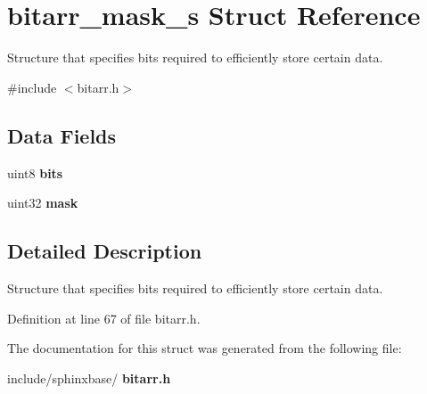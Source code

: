 \section{bitarr\+\_\+mask\+\_\+s Struct Reference}
\label{structbitarr__mask__s}


Structure that specifies bits required to efficiently store certain data.  




{\ttfamily \#include $<$bitarr.\+h$>$}

\subsection*{Data Fields}
\begin{DoxyCompactItemize}
\item 
\mbox{\label{structbitarr__mask__s_a47b05f707efd5233f021bb1276c79b7a}} 
uint8 {\bfseries bits}
\item 
\mbox{\label{structbitarr__mask__s_a034b318c56cbc15befef989a2521623c}} 
uint32 {\bfseries mask}
\end{DoxyCompactItemize}


\subsection{Detailed Description}
Structure that specifies bits required to efficiently store certain data. 

Definition at line 67 of file bitarr.\+h.



The documentation for this struct was generated from the following file\+:\begin{DoxyCompactItemize}
\item 
include/sphinxbase/\textbf{ bitarr.\+h}\end{DoxyCompactItemize}
